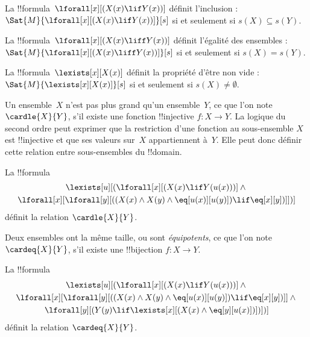 \documentclass[../../../include/open-logic-section]{subfiles}
\begin{document}


\begin{prop}
La !!{formula}~$\lforall[x][(X(x)\lif Y(x))]$
définit l'inclusion :
$\Sat{M}{\lforall[x][(X(x)\lif Y(x))]}[s]$
si et seulement si $s(X)\subseteq s(Y)$.
\end{prop}

\begin{prop}
La !!{formula}~$\lforall[x][(X(x)\liff Y(x))]$
définit l'égalité des ensembles :
$\Sat{M}{\lforall[x][(X(x)\liff Y(x))]}[s]$
si et seulement si $s(X)=s(Y)$.
\end{prop}

\begin{prop}
La !!{formula}~$\lexists[x][X(x)]$ définit
la propriété d'être non vide :
$\Sat{M}{\lexists[x][X(x)]}[s]$
si et seulement si $s(X)\neq\emptyset$.
\end{prop}

Un ensemble~$X$ n'est pas plus grand qu'un
ensemble~$Y$, ce que l'on note
$\cardle{X}{Y}$, s'il existe une fonction
!!{injective} $f\colon X\to Y$.
La logique du second ordre peut exprimer que
la restriction d'une fonction au sous-ensemble
$X$ est !!{injective} et que ses valeurs sur~$X$
appartiennent à~$Y$. Elle peut donc définir cette
relation entre sous-ensembles du !!{domain}.

\begin{prop}
La !!{formula}
\begin{multline*}
\lexists[u][(\lforall[x][(X(x)\lif Y(u(x)))]\land{}\\
\lforall[x][\lforall[y][((X(x)\land X(y)\land
\eq[u(x)][u(y)])\lif\eq[x][y])]])]
\end{multline*}
définit la relation $\cardle{X}{Y}$.
\end{prop}

Deux ensembles ont la même taille, ou sont
\emph{équipotents}, ce que l'on note
$\cardeq{X}{Y}$, s'il existe une
!!{bijection} $f\colon X\to Y$.

\begin{prop}
La !!{formula}
\begin{multline*}
\lexists[u][(\lforall[x][(X(x)\lif Y(u(x)))]\land{}\\
\lforall[x][\lforall[y][((X(x)\land X(y)\land
\eq[u(x)][u(y)])\lif\eq[x][y])]]\land{}\\
\lforall[y][(Y(y)\lif\lexists[x][(X(x)
\land\eq[y][u(x)])])])]
\end{multline*}
définit la relation $\cardeq{X}{Y}$.
\end{prop}
\end{document}
